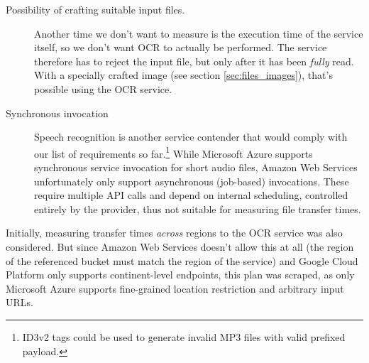 \documentclass[a4paper,bibliography=totoc]{scrartcl}
\newcommand{\Azure}{Microsoft Azure\xspace}
\newcommand{\GCP}{Google Cloud Platform\xspace}
\newcommand{\AWS}{Amazon Web Services\xspace}
\begin{document}
\begin{description}
    \item[Possibility of crafting suitable input files.] Another time we don't want to measure is the execution time of the service itself, so we don't want OCR to actually be performed. The service therefore has to reject the input file, but only after it has been \textit{fully} read. With a specially crafted image (see section \ref{sec:files_images}), that's possible using the OCR service.
    \item[Synchronous invocation] Speech recognition is another service contender that would comply with our list of requirements so far.\footnote{ID3v2 tags could be used to generate invalid MP3 files with valid prefixed payload.} While \Azure supports synchronous service invocation for short audio files,\cite{azure_speechtotext} \AWS unfortunately only support asynchronous (job-based) invocations.\cite{aws_transcribe} These require multiple API calls and depend on internal scheduling, controlled entirely by the provider, thus not suitable for measuring file transfer times.
\end{description}
Initially, measuring transfer times \textit{across} regions to the OCR service was also considered. But since \AWS doesn't allow this at all (the region of the referenced bucket must match the region of the service)\cite{aws_rekognition_s3} and \GCP only supports continent-level endpoints,\cite{gcp_ocr_endpoint} this plan was scraped, as only \Azure supports fine-grained location restriction and arbitrary input URLs.\cite{azure_ocr,azure_ocr_endpoints}
\end{document}
